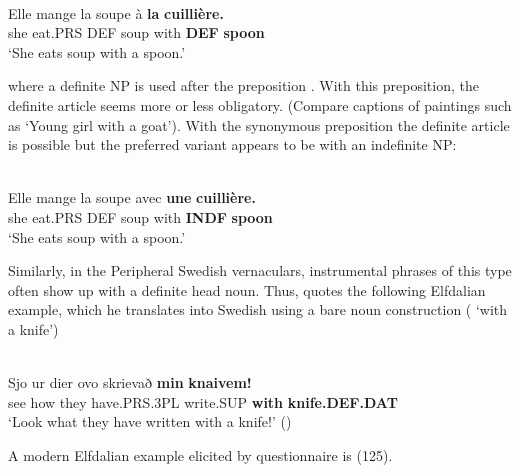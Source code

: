 
\ea \label{} 
\\
\gll Elle  mange  la  soupe  à  \textbf{la} \textbf{cuillière.}\\
she  eat.PRS  DEF  soup  with  \textbf{DEF} \textbf{spoon}\\
\glt ‘She eats soup with a spoon.’

\z

where a definite NP is used after the preposition . With this preposition, the definite article seems more or less obligatory. (Compare captions of paintings such as  ‘Young girl with a goat’). With the synonymous preposition  the definite article is possible but the preferred variant appears to be with an indefinite NP:


\ea \label{} 
\\
\gll Elle  mange  la  soupe  avec  \textbf{une} \textbf{cuillière.}\\
she  eat.PRS  DEF  soup  with  \textbf{INDF} \textbf{spoon}\\
\glt ‘She eats soup with a spoon.’

\z

Similarly, in the Peripheral Swedish vernaculars, instrumental phrases of this type often show up with a definite head noun. Thus, \citet[126]{Levander1909} quotes the following Elfdalian example, which he translates into Swedish using a bare noun construction ( ‘with a knife’)


\ea \label{} 
\\
\gll Sjo  ur  dier  ovo  skrievað  \textbf{min} \textbf{  knaivem!}\\
see  how  they  have.PRS.3PL  write.SUP  \textbf{with} \textbf{knife.DEF.DAT}\\
\glt ‘Look what they have written with a knife!’ (\citet[125]{Levander1909})

\z

A modern Elfdalian example elicited by questionnaire is (125).

